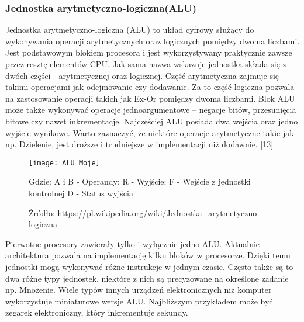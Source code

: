 \documentclass[12pt, a4paper, onside, polish]{article}				%
\begin{document}
\subsubsection{Jednostka arytmetyczno-logiczna(ALU)}
\hspace{\parindent}
	Jednostka arytmetyczno-logiczna (ALU) to układ cyfrowy służący do wykonywania operacji arytmetycznych oraz logicznych pomiędzy dwoma liczbami. Jest podstawowym blokiem procesora i jest wykorzystywany praktycznie zawsze przez resztę elementów CPU. Jak sama nazwa wskazuje jednostka składa się z dwóch części - arytmetycznej oraz logicznej. Część arytmetyczna zajmuje się takimi operacjami jak odejmowanie czy dodawanie. Za to część logiczna pozwala na zastosowanie operacji takich jak Ex-Or pomiędzy dwoma liczbami. Blok ALU może także wykonywać operacje jednoargumentowe – negacje bitów, przesunięcia bitowe czy nawet inkrementacje. Najczęściej ALU posiada dwa wejścia oraz jedno wyjście wynikowe. Warto zaznaczyć, że niektóre operacje arytmetyczne takie jak np. Dzielenie, jest droższe i trudniejsze w implementacji niż dodawnie. [13]

\begin{figure}[H]
{\centering \texttt{[image: ALU\_Moje]} \caption{Typowy symbol - ALU} \caption*{Źródło: https://pl.wikipedia.org/wiki/Jednostka_arytmetyczno-logiczna}}\vspace{5mm}
Gdzie:\newline
A i B - Operandy;\newline
R - Wyjście;\newline
F - Wejście z jednostki kontrolnej\newline
D - Status wyjścia\newline
\end{figure}

	Pierwotne procesory zawierały tylko i wyłącznie jedno ALU. Aktualnie architektura pozwala na implementację kilku bloków w procesorze. Dzięki temu jednostki mogą wykonywać różne instrukcje w jednym czasie. Często także są to dwa różne typy jednostek, niektóre z nich są precyzowane na określone zadanie np. Mnożenie. Wiele typów innych urządzeń elektronicznych niż komputer wykorzystuje miniaturowe wersje ALU. Najbliższym przykładem może być zegarek elektroniczny, który inkrementuje sekundy.  
\end{document}
